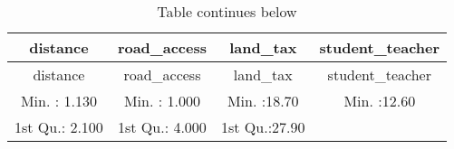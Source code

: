 \documentclass[
]{article}
\begin{document}
\begin{longtable}[]{@{}cccc@{}}
\caption{Table continues below}\tabularnewline
\toprule
\begin{minipage}[b]{0.21\columnwidth}\centering
distance\strut
\end{minipage} & \begin{minipage}[b]{0.21\columnwidth}\centering
road\_access\strut
\end{minipage} & \begin{minipage}[b]{0.20\columnwidth}\centering
land\_tax\strut
\end{minipage} & \begin{minipage}[b]{0.22\columnwidth}\centering
student\_teacher\strut
\end{minipage}\tabularnewline
\midrule
\endfirsthead
\toprule
\begin{minipage}[b]{0.21\columnwidth}\centering
distance\strut
\end{minipage} & \begin{minipage}[b]{0.21\columnwidth}\centering
road\_access\strut
\end{minipage} & \begin{minipage}[b]{0.20\columnwidth}\centering
land\_tax\strut
\end{minipage} & \begin{minipage}[b]{0.22\columnwidth}\centering
student\_teacher\strut
\end{minipage}\tabularnewline
\midrule
\endhead
\begin{minipage}[t]{0.21\columnwidth}\centering
Min. : 1.130\strut
\end{minipage} & \begin{minipage}[t]{0.21\columnwidth}\centering
Min. : 1.000\strut
\end{minipage} & \begin{minipage}[t]{0.20\columnwidth}\centering
Min. :18.70\strut
\end{minipage} & \begin{minipage}[t]{0.22\columnwidth}\centering
Min. :12.60\strut
\end{minipage}\tabularnewline
\begin{minipage}[t]{0.21\columnwidth}\centering
1st Qu.: 2.100\strut
\end{minipage} & \begin{minipage}[t]{0.21\columnwidth}\centering
1st Qu.: 4.000\strut
\end{minipage} & \begin{minipage}[t]{0.20\columnwidth}\centering
1st Qu.:27.90\strut

\end{minipage}
\end{longtable}
\end{document}
